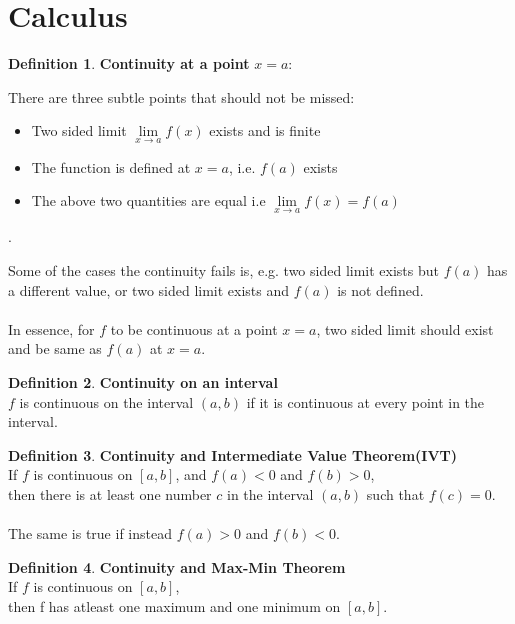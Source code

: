\documentclass[10pt,a4paper]{article}
\begin{document}
	\theoremstyle{definition}
	\newtheorem{defn}{Definition}[section]
	
	\section{Calculus}
	\begin{defn}
		\textbf{Continuity at a point} $x = a$:\\

	\end{defn}
	There are three subtle points that should not be missed:
	\begin{itemize}
		\item Two sided limit $\lim\limits_{x \to a} f(x)$ exists and is finite
		\item The function is defined at $x = a$, i.e. $f(a)$ exists
		\item The above two quantities are equal i.e 
		$\lim\limits_{x \to a} f(x) = f(a)$	
	\end{itemize}.

	Some of the cases the continuity fails is, e.g. two sided limit exists but $f(a)$ has a different value, or two sided limit exists and $f(a)$ is not defined.\\ \\ In essence, for $f$ to be continuous at a point $x = a$, two sided limit should exist and be same as $f(a)$ at $x = a$.
	
	\begin{defn}
		\textbf{Continuity on an interval}\\
		$f$ is continuous on the interval $(a,b)$ if it is continuous
		at every point in the interval.
		
		
	\end{defn}

	\begin{defn}
	\textbf{Continuity and Intermediate Value Theorem(IVT)}\\
	If $f$ is continuous on $[a,b]$, and $f(a) < 0$ and $f(b) > 0$,\\ then there is at least one number $c$ in the interval $(a,b)$ such that
	$f(c) = 0$.\\ \\ The same is true if instead $f(a) > 0$ and $f(b) < 0$.	
	
\end{defn}

	\begin{defn}
	\textbf{Continuity and Max-Min Theorem}\\
	If $f$ is continuous on $[a,b]$,\\
	then f has atleast one maximum and one minimum on $[a,b]$.	
	
\end{defn}
	
\end{document}
